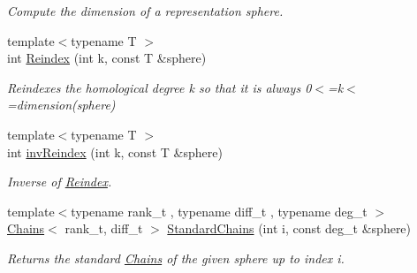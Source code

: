 \begin{DoxyCompactItemize}
\begin{DoxyCompactList}\small\item\em Compute the dimension of a representation sphere. \end{DoxyCompactList}\item 
{\footnotesize template$<$typename T $>$ }\\int \hyperlink{namespaceMackey_acb84c147d9ee39eac2883a762e3710dd}{Reindex} (int k, const T \&sphere)
\begin{DoxyCompactList}\small\item\em Reindexes the homological degree k so that it is always 0$<$=k$<$=dimension(sphere) \end{DoxyCompactList}\item 
{\footnotesize template$<$typename T $>$ }\\int \hyperlink{namespaceMackey_a011b8e23bc2eedf751a9ce7bdc9e4cb9}{inv\+Reindex} (int k, const T \&sphere)
\begin{DoxyCompactList}\small\item\em Inverse of \hyperlink{namespaceMackey_a7da73ade3ee83c4ffd614e79242d7c04}{Reindex}. \end{DoxyCompactList}\item 
{\footnotesize template$<$typename rank\+\_\+t , typename diff\+\_\+t , typename deg\+\_\+t $>$ }\\\hyperlink{classMackey_1_1Chains}{Chains}$<$ rank\+\_\+t, diff\+\_\+t $>$ \hyperlink{namespaceMackey_aac9deeccbe291d1dd17df46a3d7c1f2b}{Standard\+Chains} (int i, const deg\+\_\+t \&sphere)
\begin{DoxyCompactList}\small\item\em Returns the standard \hyperlink{classMackey_1_1Chains}{Chains} of the given sphere up to index i. \end{DoxyCompactList}\end{DoxyCompactItemize}
